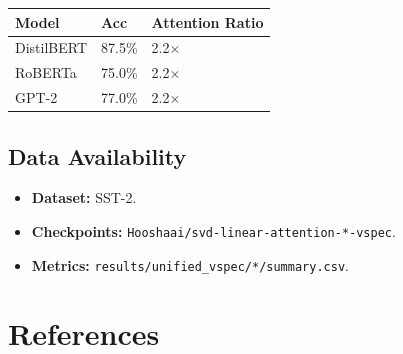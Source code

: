 \begin{table}[H]
\centering
\small
\begin{tabular}{lll}
\toprule
\textbf{Model} & \textbf{Acc} & \textbf{Attention Ratio} \\
\midrule
DistilBERT & 87.5\% & 2.2$\times$ \\
RoBERTa & 75.0\% & 2.2$\times$ \\
GPT-2 & 77.0\% & 2.2$\times$ \\
\bottomrule
\end{tabular}
\end{table}

\subsection{Data Availability}

\begin{itemize}
\item \textbf{Dataset:} SST-2.
\item \textbf{Checkpoints:} \texttt{Hooshaai/svd-linear-attention-*-vspec}.
\item \textbf{Metrics:} \texttt{results/unified\_vspec/*/summary.csv}.

\end{itemize}


\section{References}

